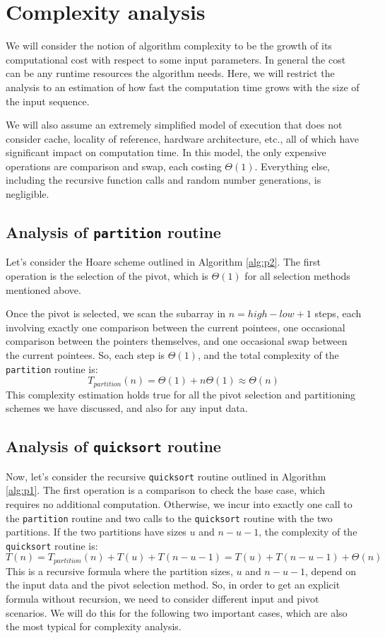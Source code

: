 \documentclass[]{finalproject}
\begin{document}
\section{Complexity analysis}

We will consider the notion of algorithm complexity to be the growth of its computational cost with respect to some input parameters.
In general the cost can be any runtime resources the algorithm needs.
Here, we will restrict the analysis to an estimation of how fast the computation time grows with the size of the input sequence.

We will also assume an extremely simplified model of execution that does not consider cache, locality of reference, hardware architecture, etc.,
all of which have significant impact on computation time. In this model, the only expensive operations are comparison and swap,
each costing $\Theta({1})$.
Everything else, including the recursive function calls and random number generations, is negligible.

\subsection{Analysis of \texttt{partition} routine}

Let's consider the Hoare scheme outlined in Algorithm \ref{alg:p2}. The first operation is the selection of the pivot,
which is $\Theta(1)$ for all selection methods mentioned above.

Once the pivot is selected, we scan the subarray in $n = high - low + 1$ steps, each involving exactly one comparison between the current pointees,
one occasional comparison between the pointers themselves, and one occasional swap between the current pointees.
So, each step is $\Theta(1)$, and the total complexity of the \texttt{partition} routine is: $$T_{partition}(n) = \Theta(1) + n\Theta(1) \approx \Theta(n)$$
This complexity estimation holds true for all the pivot selection and partitioning schemes we have discussed, and also for any input data.

\subsection{Analysis of \texttt{quicksort} routine}

Now, let's consider the recursive \texttt{quicksort} routine outlined in Algorithm \ref{alg:p1}.
The first operation is a comparison to check the base case, which requires no additional computation.
Otherwise, we incur into exactly one call to the \texttt{partition} routine and two calls to the \texttt{quicksort} routine with the two partitions.
If the two partitions have sizes $u$ and $n-u-1$, the complexity of the \texttt{quicksort} routine is:
$$T(n) = T_{partition}(n) + T(u) + T(n-u-1) = T(u) + T(n-u-1) + \Theta(n)$$
This is a recursive formula where the partition sizes, $u$ and $n-u-1$, depend on the input data and the pivot selection method.
So, in order to get an explicit formula without recursion, we need to consider different input and pivot scenarios.
We will do this for the following two important cases, which are also the most typical for complexity analysis.
\end{document}
